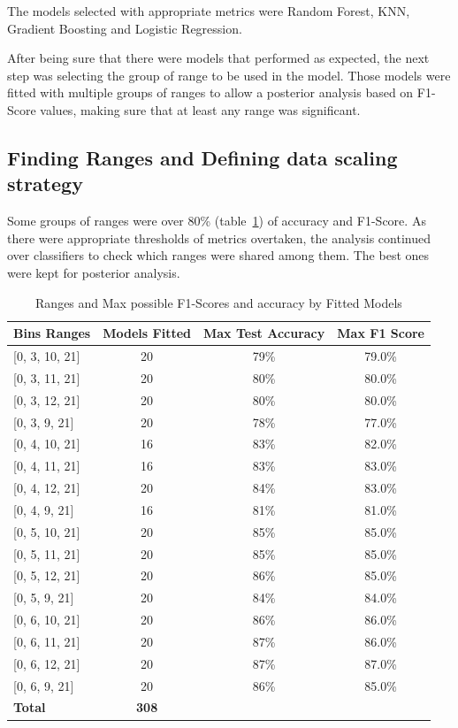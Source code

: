 		The models selected with appropriate metrics were Random Forest, KNN, Gradient Boosting and Logistic
		Regression.

		After being sure that there were models that performed as expected, the next step was selecting the
		group of range to be used in the model. Those models were fitted with multiple groups of ranges to allow a
		posterior analysis based on F1-Score values, making sure that at least any range was significant.

		\subsection{Finding Ranges and Defining data scaling strategy}

			Some groups of ranges were over 80\% (table~\ref{tab:bins-ranges})
			of accuracy and F1-Score. As there were appropriate thresholds of metrics overtaken, the analysis
			continued over classifiers to check which ranges were shared among them. The best ones were kept for
			posterior analysis.

			\begin{table}[ht]
				\centering
				\small
				\begin{tabular}{|l|c|c|c|}
					\hline
					\textbf{Bins Ranges} & \textbf{Models Fitted} & \textbf{Max Test Accuracy}
					& \textbf{Max F1 Score}
					\\
					\hline
					{[}0, 3, 10, 21{]} & 20 & 79\% & 79.0\% \\
					{[}0, 3, 11, 21{]} & 20 & 80\% & 80.0\% \\
					{[}0, 3, 12, 21{]} & 20 & 80\% & 80.0\% \\
					{[}0, 3, 9, 21{]}  & 20 & 78\% & 77.0\% \\
					{[}0, 4, 10, 21{]} & 16 & 83\% & 82.0\% \\
					{[}0, 4, 11, 21{]} & 16 & 83\% & 83.0\% \\
					{[}0, 4, 12, 21{]} & 20 & 84\% & 83.0\% \\
					{[}0, 4, 9, 21{]}  & 16 & 81\% & 81.0\% \\
					{[}0, 5, 10, 21{]} & 20 & 85\% & 85.0\% \\
					{[}0, 5, 11, 21{]} & 20 & 85\% & 85.0\% \\
					{[}0, 5, 12, 21{]} & 20 & 86\% & 85.0\% \\
					{[}0, 5, 9, 21{]}  & 20 & 84\% & 84.0\% \\
					{[}0, 6, 10, 21{]} & 20 & 86\% & 86.0\% \\
					{[}0, 6, 11, 21{]} & 20 & 87\% & 86.0\% \\
					{[}0, 6, 12, 21{]} & 20 & 87\% & 87.0\% \\
					{[}0, 6, 9, 21{]} & 20 & 86\% & 85.0\%
					\\
					\hline
					\textbf{Total} & \textbf{308} & \textbf{} & \textbf{}
					\\
					\hline
				\end{tabular}
				\caption{Ranges and Max possible F1-Scores and accuracy by Fitted Models}
				\label{tab:bins-ranges}
			\end{table}


